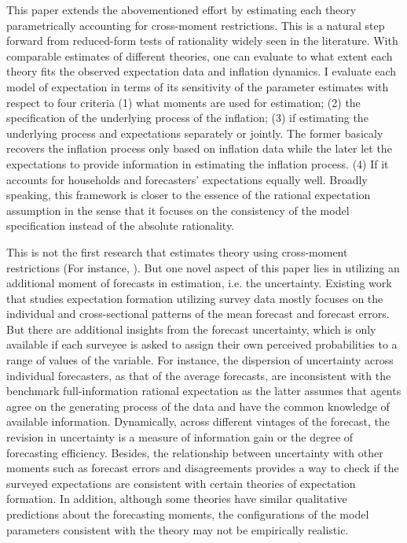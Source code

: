 \documentclass[12pt]{article}
\begin{document}
	This paper extends the abovementioned effort by estimating each theory parametrically accounting for cross-moment restrictions. This is a natural step forward from reduced-form tests of rationality widely seen in the literature. With comparable estimates of different theories, one can evaluate to what extent each theory fits the observed expectation data and inflation dynamics.  I evaluate each model of expectation in terms of its sensitivity of the parameter estimates with respect to four criteria (1) what moments are used for estimation; (2) the specification of the underlying process of the inflation; (3)  if estimating the underlying process and expectations separately or jointly. The former basicaly recovers the inflation process only based on inflation data while the later let the expectations to provide information in estimating the inflation process. (4) If it accounts for households and forecasters' expectations equally well.  Broadly speaking, this framework is closer to the essence of the rational expectation assumption in the sense that it focuses on the consistency of the model specification instead of the absolute rationality. 
	
	This is not the first research that estimates theory using cross-moment restrictions (For instance, \cite{giacomini2020heterogeneity}). But one novel aspect of this paper lies in utilizing an additional moment of forecasts in estimation, i.e. the uncertainty. Existing work that studies expectation formation utilizing survey data mostly focuses on the individual and cross-sectional patterns of the mean forecast and forecast errors. But there are additional insights from the forecast uncertainty, which is only available if each surveyee is asked to assign their own perceived probabilities to a range of values of the variable. For instance, the dispersion of uncertainty across individual forecasters, as that of the average forecasts, are inconsistent with the benchmark full-information rational expectation as the latter assumes that agents agree on the generating process of the data and have the common knowledge of available information. Dynamically, across different vintages of the forecast, the revision in uncertainty is a measure of information gain or the degree of forecasting efficiency. Besides, the relationship between uncertainty with other moments such as forecast errors and disagreements provides a way to check if the surveyed expectations are consistent with certain theories of expectation formation. In addition, although some theories have similar qualitative predictions about the forecasting moments, the configurations of the model parameters consistent with the theory may not be empirically realistic. 
	
\end{document}
